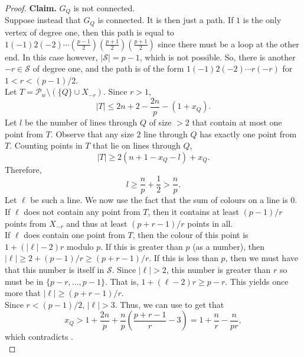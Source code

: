 \begin{proof}
		\textbf{Claim.} $G_Q$ is not connected.\\
		Suppose instead that $G_Q$ is connected.
		It is then just a path. If $1$ is the only vertex of degree one, then this path is equal to $1(-1)2(-2)\cdots (\frac{p-1}{2})(\frac{p+1}{2})(\frac{p+1}{2})$ since there must be a loop at the other end. In this case however, $|\mathcal{S}| = p-1$, which is not possible. So, there is another $-r \in \mathcal{S}$ of degree one, and the path is of the form $1 (-1) 2 (-2) \cdots r (-r)$ for $1 < r < (p-1)/2$.\\
		Let $T = \mathcal{P}_w \setminus (\{Q\} \cup X_{-r})$. Since $r > 1$,
		\[ |T| \le 2n + 2 - \frac{2n}{p} - (1 + x_Q). \]
		Let $l$ be the number of lines through $Q$ of size $>2$ that contain at most one point from $T$. Observe that any size $2$ line through $Q$ has exactly one point from $T$. Counting points in $T$ that lie on lines through $Q$,
		\[ |T| \ge 2 (n+1 - x_Q - l) + x_Q. \]
		Therefore,
		\[ l \ge \frac{n}{p} + \frac{1}{2} > \frac{n}{p}. \]
		Let $\ell$ be such a line. We now use the fact that the sum of colours on a line is $0$. \\
		If $\ell$ does not contain any point from $T$, then it contains at least $(p-1)/r$ points from $X_{-r}$ and thus at least $(p+r-1)/r$ points in all.\\
		If $\ell$ does contain one point from $T$, then the colour of this point is $1 + (|\ell|-2)r$ modulo $p$. If this is greater than $p$ (as a number), then $|\ell| \ge 2 + (p-1)/r \ge (p+r-1)/r$. If this is less than $p$, then we must have that this number is itself in $\mathcal{S}$. Since $|\ell| > 2$, this number is greater than $r$ so must be in $\{p-r,\ldots,p-1\}$. That is, $1 + (\ell-2)r \ge p-r$. This yields once more that $|\ell| \ge (p+r-1)/r$.\\
		Since $r < (p-1)/2$, $|\ell| > 3$. Thus, we can use  to get that
		\[ x_Q > 1 + \frac{2n}{p} + \frac{n}{p} \left( \frac{p+r-1}{r} - 3 \right) = 1 + \frac{n}{r} - \frac{n}{pr}, \]
		which contradicts . \qedwhite \\


\end{proof}
